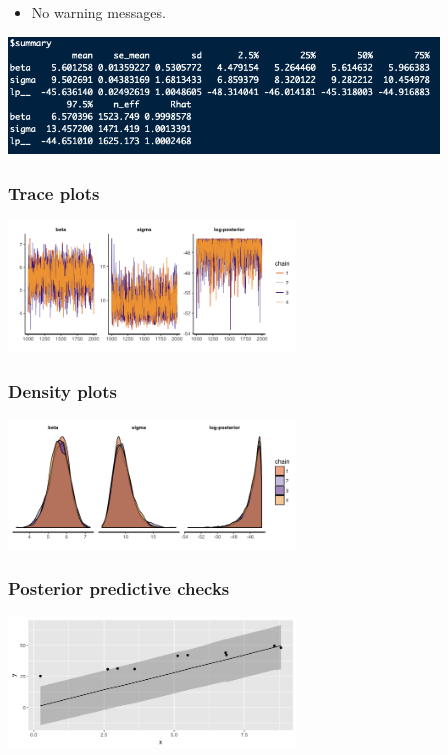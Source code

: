 \documentclass[xcolor=table]{beamer}
\begin{document}
\begin{frame}
  \begin{itemize}
    \item No warning messages.
  \end{itemize}
  \begin{center}
    \includegraphics[width=4.5in]{../figures/linear_summary}
  \end{center}
\end{frame}

\begin{frame}
  \frametitle{Trace plots}
  \begin{center}
    \includegraphics[width=3in]{../figures/linear_trace.png}
  \end{center}
\end{frame}

\begin{frame}
  \frametitle{Density plots}
  \begin{center}
    \includegraphics[width=3in]{../figures/linear_dens_plot.png}
  \end{center}
\end{frame}

\begin{frame}
  \frametitle{Posterior predictive checks}
  \begin{center}
    \includegraphics[width=3in]{../figures/linear_pred.png}
  \end{center}
\end{frame}
\end{document}
